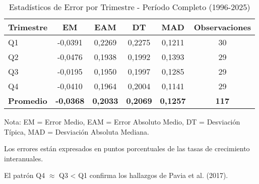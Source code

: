 \begin{table}[h]
\centering
\caption{Estadísticos de Error por Trimestre - Período Completo (1996-2025)}
\label{tab:errores_trimestre}
\begin{tabular}{lccccc}
\toprule
\textbf{Trimestre} & \textbf{EM} & \textbf{EAM} & \textbf{DT} & \textbf{MAD} & \textbf{Observaciones} \\
\midrule
Q1 & -0,0391 & 0,2269 & 0,2275 & 0,1211 & 30 \\
Q2 & -0,0476 & 0,1938 & 0,1992 & 0,1393 & 29 \\
Q3 & -0,0195 & 0,1950 & 0,1997 & 0,1285 & 29 \\
Q4 & -0,0410 & 0,1964 & 0,2004 & 0,1141 & 29 \\
\midrule
\textbf{Promedio} & \textbf{-0,0368} & \textbf{0,2033} & \textbf{0,2069} & \textbf{0,1257} & \textbf{117} \\
\bottomrule
\end{tabular}
\begin{tablenotes}
\footnotesize
\item Nota: EM = Error Medio, EAM = Error Absoluto Medio, DT = Desviación Típica, MAD = Desviación Absoluta Mediana.
\item Los errores están expresados en puntos porcentuales de las tasas de crecimiento interanuales.
\item El patrón Q4 $\approx$ Q3 < Q1 confirma los hallazgos de Pavia et al. (2017).
\end{tablenotes}
\end{table}